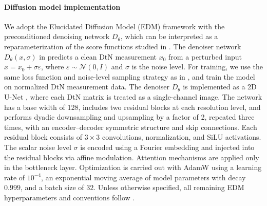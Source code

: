 \documentclass{article}
\begin{document}
\paragraph{Diffusion model implementation}
We adopt the Elucidated Diffusion Model (EDM) framework \citep{karras2022elucidating} with the preconditioned denoising network $D_{\theta}$, which can be interpreted as a reparameterization of the score functions studied in \citet{song2020score, ho2020denoising}. The denoiser network $D_\theta(x,\sigma)$ in \citet{karras2022elucidating} predicts a clean DtN measurement $x_0$ from a perturbed input $x = x_0 + \sigma \varepsilon$, where $\varepsilon \sim \mathcal{N}(0,I)$ and $\sigma$ is the noise level. 
For training, we use the same loss function and noise-level sampling strategy as in \citet{karras2022elucidating}, and train the model on normalized DtN measurement data. 
The denoiser $D_{\theta}$ is implemented as a 2D U-Net \citep{ronneberger2015u}, where each DtN matrix is treated as a single-channel image. The network has a base width of 128, includes two residual blocks at each resolution level, and performs dyadic downsampling and upsampling by a factor of 2, repeated three times, with an encoder--decoder symmetric structure and skip connections. Each residual block consists of $3\times 3$ convolutions, normalization, and SiLU activations. The scalar noise level $\sigma$ is encoded using a Fourier embedding and injected into the residual blocks via affine modulation. Attention mechanisms are applied only in the bottleneck layer. 
Optimization is carried out with AdamW \citep{loshchilov2017decoupled} using a learning rate of $10^{-4}$, an exponential moving average of model parameters with decay $0.999$, and a batch size of $32$. Unless otherwise specified, all remaining EDM hyperparameters and conventions follow \citet{karras2022elucidating}.
\end{document}
